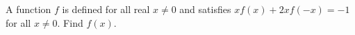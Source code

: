 A function $f$ is defined for all real $x\ne0$ and satisfies $xf(x)+2xf(-x)=-1$ for all $x\ne0$. Find $f(x)$.
